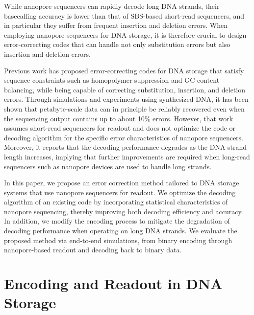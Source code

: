 \documentclass[sotsuron]{kuee}
\begin{document}
While nanopore sequencers can rapidly decode long DNA strands, their basecalling accuracy is lower than that of SBS-based
short-read sequencers, and in particular they suffer from frequent insertion and deletion errors\cite{Amarasinghe2020,Dorey2024}.
When employing nanopore sequencers for DNA storage, it is therefore crucial to design error-correcting codes that can
handle not only substitution errors but also insertion and deletion errors.

Previous work has proposed error-correcting codes for DNA storage that satisfy sequence constraints such as
homopolymer suppression and GC-content balancing, while being capable of correcting substitution, insertion,
and deletion errors.
Through simulations and experiments using synthesized DNA, it has been shown that petabyte-scale data can in principle
be reliably recovered even when the sequencing output contains up to about 10\% errors\cite{HEDGES}.
However, that work assumes short-read sequencers for readout and does not optimize the code or decoding algorithm
for the specific error characteristics of nanopore sequencers.
Moreover, it reports that the decoding performance degrades as the DNA strand length increases, implying that
further improvements are required when long-read sequencers such as nanopore devices are used to handle long strands.

In this paper, we propose an error correction method tailored to DNA storage systems that use nanopore sequencers for readout.
We optimize the decoding algorithm of an existing code by incorporating statistical characteristics of nanopore sequencing,
thereby improving both decoding efficiency and accuracy.
In addition, we modify the encoding process to mitigate the degradation of decoding performance when operating on
long DNA strands.
We evaluate the proposed method via end-to-end simulations, from binary encoding through nanopore-based readout
and decoding back to binary data.

\section{Encoding and Readout in DNA Storage}
\end{document}
